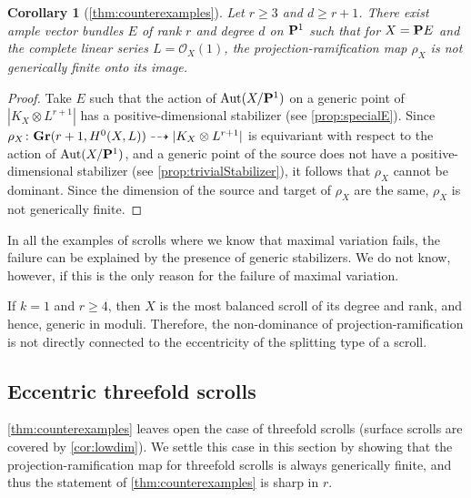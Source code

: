 \documentclass[11pt,reqno]{amsart}
\theoremstyle{plain}
\newtheorem{corollary}[theorem]{Corollary}
\theoremstyle{definition}
\theoremstyle{remark}
\numberwithin{equation}{section}
\numberwithin{equation}{section}
\renewcommand{\O}{\mathcal O}
\begin{document}
\begin{corollary}[\autoref{thm:counterexamples}]
  \label{cor:actualcounterexamples}
  Let $r \geq 3$ and $d \geq r+1$.
  There exist ample vector bundles $E$ of rank $r$ and degree $d$ on $\P^1$ such that for $X = \P E$ and the complete linear series $L = \O_X(1)$, the projection-ramification map $\rho_X$ is not generically finite onto its image.
\end{corollary}
\begin{proof}
  Take $E$ such that the action of $\Aut(X/\P^1)$ on a generic point of $|K_X\otimes L^{r+1}|$ has a positive-dimensional stabilizer (see \autoref{prop:specialE}).
  Since $\rho_X \from \Gr(r+1, H^0(X, L)) \dashrightarrow |K_X \otimes L^{r+1}|$ is equivariant with respect to the action of $\Aut(X/\P^1)$, and a generic
  point of the source does not have a positive-dimensional stabilizer (see \autoref{prop:trivialStabilizer}), it follows that $\rho_X$ cannot be dominant.
  Since the dimension of the source and target of $\rho_X$ are the same, $\rho_X$ is not generically finite.
\end{proof}

\begin{remark}
In all the examples of scrolls where we know that maximal variation fails, the failure can be explained by the presence of generic stabilizers.
We do not know, however, if this is the only reason for the failure of maximal variation.
\end{remark}

\begin{remark}
  If $k = 1$ and $r \geq 4$, then $X$ is the most balanced scroll of its degree and rank, and hence, generic in moduli.
  Therefore, the non-dominance of projection-ramification is not directly connected to the eccentricity of the splitting type of a scroll. 
\end{remark}

\subsection{Eccentric threefold scrolls} %
\label{sec:eccentric_threefolds}
\autoref{thm:counterexamples} leaves open the case of threefold scrolls (surface scrolls are covered by \autoref{cor:lowdim}).
We settle this case in this section by showing that the projection-ramification map for threefold scrolls is always generically finite, and thus the statement of \autoref{thm:counterexamples} is sharp in $r$.
\end{document}
